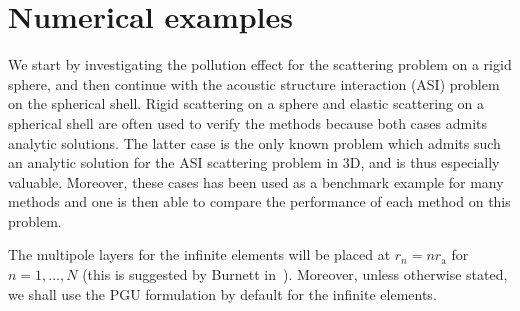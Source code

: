 \section{Numerical examples} 
\label{Sec2:resultsDisc}
We start by investigating the pollution effect for the scattering problem on a rigid sphere, and then continue with the acoustic structure interaction (ASI) problem on the spherical shell. Rigid scattering on a sphere and elastic scattering on a spherical shell are often used to verify the methods because both cases admits analytic solutions. The latter case is the only known problem which admits such an analytic solution for the ASI scattering problem in 3D, and is thus especially valuable. Moreover, these cases has been used as a benchmark example for many methods and one is then able to compare the performance of each method on this problem.

The multipole layers for the infinite elements will be placed at $r_n=nr_{\mathrm{a}}$ for $n=1,\dots,N$ (this is suggested by Burnett in~\cite{Burnett1994atd}). Moreover, unless otherwise stated, we shall use the PGU formulation by default for the infinite elements.

